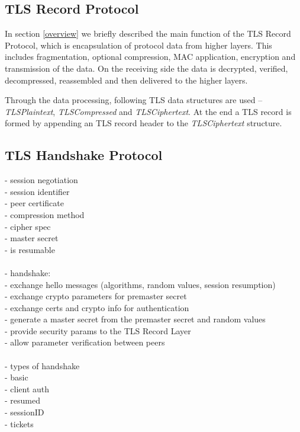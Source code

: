 \subsection{TLS Record Protocol}
    In section \ref{overview} we briefly described the main function of the
    TLS Record Protocol, which is encapsulation of protocol data from higher
    layers. This includes fragmentation, optional compression, MAC application,
    encryption and transmission of the data. On the receiving side the data is
    decrypted, verified, decompressed, reassembled and then delivered to the
    higher layers.

    Through the data processing, following TLS data structures are used --
    \textit{TLSPlaintext}, \textit{TLSCompressed} and \textit{TLSCiphertext}.
    At the end a TLS record is formed by appending an TLS record header to
    the \textit{TLSCiphertext} structure.

\subsection{TLS Handshake Protocol}
- session negotiation \\
    - session identifier \\
    - peer certificate \\
    - compression method \\
    - cipher spec \\
    - master secret \\
    - is resumable \\
\\
- handshake: \\
    - exchange hello messages (algorithms, random values, session resumption) \\
    - exchange crypto parameters for premaster secret \\
    - exchange certs and crypto info for authentication \\
    - generate a master secret from the premaster secret and random values \\
    - provide security params to the TLS Record Layer \\
    - allow parameter verification between peers \\
\\
- types of handshake \\
    - basic \\
    - client auth \\
    - resumed \\
        - sessionID \\
        - tickets
